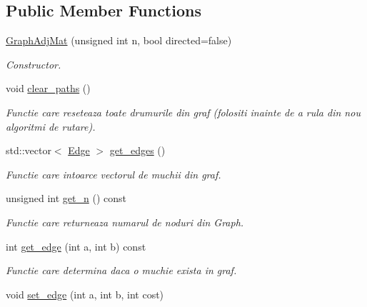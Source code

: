 \subsection*{Public Member Functions}
\begin{DoxyCompactItemize}
\item 
\hyperlink{classGraphAdjMat_a31e0dcb775dbff2143bb23362570f06a}{GraphAdjMat} (unsigned int n, bool directed=false)
\begin{DoxyCompactList}\small\item\em Constructor. \item\end{DoxyCompactList}\item 
\hypertarget{classGraphAdjMat_a14096e1110de31ed885a5db3aefc0352}{
void \hyperlink{classGraphAdjMat_a14096e1110de31ed885a5db3aefc0352}{clear\_\-paths} ()}
\label{classGraphAdjMat_a14096e1110de31ed885a5db3aefc0352}

\begin{DoxyCompactList}\small\item\em Functie care reseteaza toate drumurile din graf (folositi inainte de a rula din nou algoritmi de rutare). \item\end{DoxyCompactList}\item 
std::vector$<$ \hyperlink{structEdge}{Edge} $>$ \hyperlink{classGraphAdjMat_a001e4a1c68a16e97bcd46803d22aa09a}{get\_\-edges} ()
\begin{DoxyCompactList}\small\item\em Functie care intoarce vectorul de muchii din graf. \item\end{DoxyCompactList}\item 
unsigned int \hyperlink{classGraphAdjMat_a5085b90aa536ef045a93902f18eb8867}{get\_\-n} () const 
\begin{DoxyCompactList}\small\item\em Functie care returneaza numarul de noduri din Graph. \item\end{DoxyCompactList}\item 
int \hyperlink{classGraphAdjMat_aff425a66e306023d3465336ff9392b27}{get\_\-edge} (int a, int b) const 
\begin{DoxyCompactList}\small\item\em Functie care determina daca o muchie exista in graf. \item\end{DoxyCompactList}\item 
\hypertarget{classGraphAdjMat_af97e10d2dc5ecbefe2e24aa064e3f9b1}{
void \hyperlink{classGraphAdjMat_af97e10d2dc5ecbefe2e24aa064e3f9b1}{set\_\-edge} (int a, int b, int cost)}
\label{classGraphAdjMat_af97e10d2dc5ecbefe2e24aa064e3f9b1}


\end{DoxyCompactItemize}
